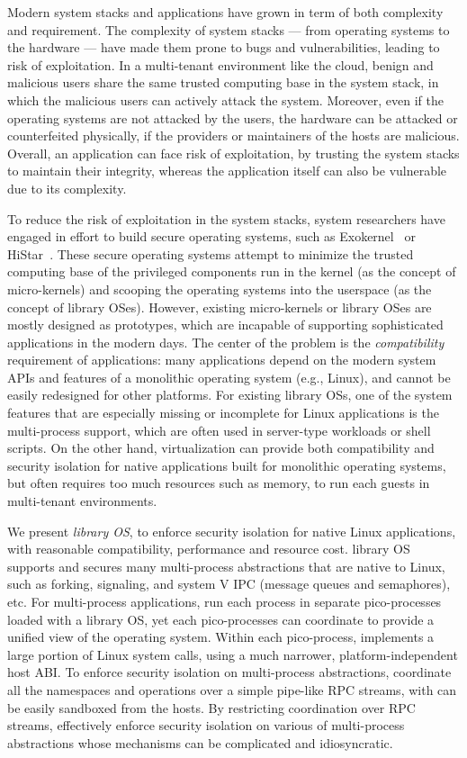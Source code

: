 Modern system stacks and applications have grown in term of both complexity and requirement.
The complexity of system stacks --- from operating systems to the hardware --- have made them prone to bugs and vulnerabilities,
leading to risk of exploitation.
In a multi-tenant environment like the cloud, benign and malicious users share the same trusted computing base in the system stack,
in which the malicious users can actively attack the system.
Moreover, even if the operating systems are not attacked by the users,
the hardware can be attacked or counterfeited physically, if the providers or maintainers of the hosts are malicious.
Overall, an application can face risk of exploitation,
by trusting the system stacks to maintain their integrity, whereas the application itself can also be vulnerable due to its complexity.

To reduce the risk of exploitation in the system stacks,
system researchers have engaged in effort to build secure operating systems, such as Exokernel~\citep{engler95exokernel} or HiStar~\citep{zeldovich+histar}.
These secure operating systems attempt to minimize the trusted computing base of the privileged components run in the kernel (as the concept of micro-kernels) and scooping the operating systems into the userspace (as the concept of library OSes).
However, existing micro-kernels or library OSes are mostly designed as prototypes, which are incapable of supporting sophisticated applications in the modern days.
The center of the problem is the {\em compatibility} requirement of applications:
many applications depend on the modern system APIs and features of a monolithic operating system (e.g., Linux), and cannot be easily redesigned for other platforms.
For existing library OSs,
one of the system features that are especially missing or incomplete for Linux applications is the multi-process support,
which are often used in server-type workloads or shell scripts.
On the other hand, virtualization can provide both compatibility and security isolation for native applications built for monolithic operating systems, but often requires too much resources such as memory, to run each guests in multi-tenant environments.

We present {\em \graphene{} library OS}, to enforce security isolation for native Linux applications,
with reasonable compatibility, performance and resource cost.
\graphene{} library OS supports and secures many multi-process abstractions that are native to Linux, such as forking, signaling, and system V IPC (message queues and semaphores), etc.
For multi-process applications, \graphene{} run each process in separate pico-processes loaded with a library OS,
yet each pico-processes can coordinate to provide a unified view of the operating system.
Within each pico-process, \graphene{} implements a large portion of Linux system calls, using a much narrower, platform-independent host ABI.
To enforce security isolation on multi-process abstractions,
\graphene{} coordinate all the namespaces and operations
over a simple pipe-like RPC streams, with can be easily sandboxed from the hosts.
By restricting coordination over RPC streams,
\graphene{} effectively enforce security isolation on various of multi-process abstractions whose mechanisms can be complicated and idiosyncratic.

